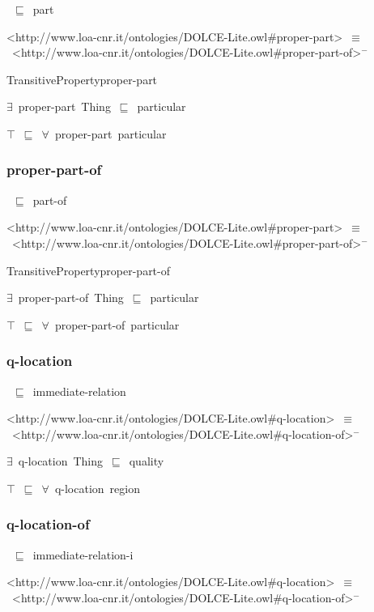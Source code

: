 \documentclass{article}
\begin{document}
~\ensuremath{\sqsubseteq}~part

<http://www.loa-cnr.it/ontologies/DOLCE-Lite.owl#proper-part>~\ensuremath{\equiv}~<http://www.loa-cnr.it/ontologies/DOLCE-Lite.owl#proper-part-of>\ensuremath{^-}

TransitivePropertyproper-part

\ensuremath{\exists}~proper-part~Thing~\ensuremath{\sqsubseteq}~particular

\ensuremath{\top}~\ensuremath{\sqsubseteq}~\ensuremath{\forall}~proper-part~particular

\subsubsection*{proper-part-of}

~\ensuremath{\sqsubseteq}~part-of

<http://www.loa-cnr.it/ontologies/DOLCE-Lite.owl#proper-part>~\ensuremath{\equiv}~<http://www.loa-cnr.it/ontologies/DOLCE-Lite.owl#proper-part-of>\ensuremath{^-}

TransitivePropertyproper-part-of

\ensuremath{\exists}~proper-part-of~Thing~\ensuremath{\sqsubseteq}~particular

\ensuremath{\top}~\ensuremath{\sqsubseteq}~\ensuremath{\forall}~proper-part-of~particular

\subsubsection*{q-location}

~\ensuremath{\sqsubseteq}~immediate-relation

<http://www.loa-cnr.it/ontologies/DOLCE-Lite.owl#q-location>~\ensuremath{\equiv}~<http://www.loa-cnr.it/ontologies/DOLCE-Lite.owl#q-location-of>\ensuremath{^-}

\ensuremath{\exists}~q-location~Thing~\ensuremath{\sqsubseteq}~quality

\ensuremath{\top}~\ensuremath{\sqsubseteq}~\ensuremath{\forall}~q-location~region

\subsubsection*{q-location-of}

~\ensuremath{\sqsubseteq}~immediate-relation-i

<http://www.loa-cnr.it/ontologies/DOLCE-Lite.owl#q-location>~\ensuremath{\equiv}~<http://www.loa-cnr.it/ontologies/DOLCE-Lite.owl#q-location-of>\ensuremath{^-}
\end{document}
